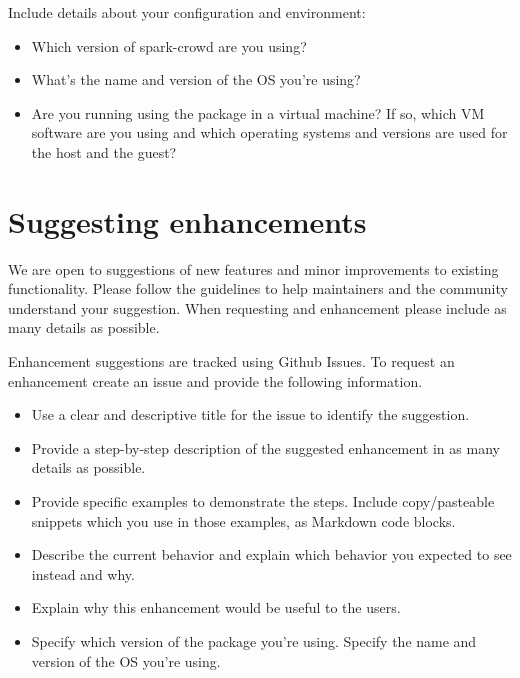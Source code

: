 \documentclass[letterpaper,10pt,english]{sphinxmanual}
\begin{document}
Include details about your configuration and environment:
\begin{itemize}
\item {} 
Which version of spark-crowd are you using?

\item {} 
What’s the name and version of the OS you’re using?

\item {} 
Are you running using the package in a virtual machine? If so, which VM software are you using and which operating systems and versions are used for the host and the guest?

\end{itemize}


\section{Suggesting enhancements}
\label{\detokenize{package/contributors:suggesting-enhancements}}
We are open to suggestions of new features and minor improvements to existing functionality. Please follow the guidelines to help maintainers and the community
understand your suggestion. When requesting and enhancement please include as many details as possible.

Enhancement suggestions are tracked using Github Issues. To request an enhancement create an issue and provide the following information.
\begin{itemize}
\item {} 
Use a clear and descriptive title for the issue to identify the suggestion.

\item {} 
Provide a step-by-step description of the suggested enhancement in as many details as possible.

\item {} 
Provide specific examples to demonstrate the steps. Include copy/pasteable snippets which you use in those examples, as Markdown code blocks.

\item {} 
Describe the current behavior and explain which behavior you expected to see instead and why.

\item {} 
Explain why this enhancement would be useful to the users.

\item {} 
Specify which version of the package you’re using. Specify the name and version of the OS you’re using.

\end{itemize}
\end{document}
